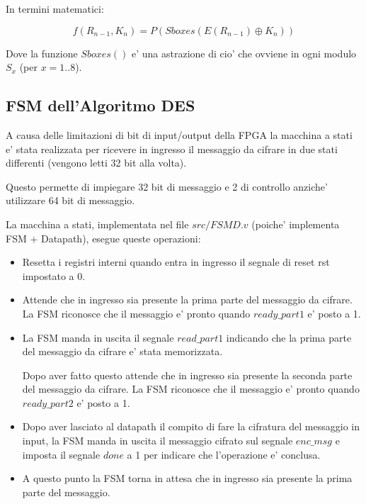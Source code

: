 \documentclass[a4paper]{article}
\begin{document}
In termini matematici:

$$f(R_{n-1}, K_n) = P(Sboxes(E(R_{n-1}) \oplus K_n))$$

Dove la funzione $Sboxes()$ e' una astrazione di cio' che ovviene in ogni modulo $S_x$ (per $x = 1 .. 8$).




\subsection{FSM dell'Algoritmo DES}

A causa delle limitazioni di bit di input/output della FPGA la macchina a stati e' stata realizzata per ricevere in ingresso il messaggio da cifrare in due stati differenti (vengono letti 32 bit alla volta).

Questo permette di impiegare 32 bit di messaggio e 2 di controllo anziche' utilizzare 64 bit di messaggio.

La macchina a stati, implementata nel file $src/FSMD.v$ (poiche' implementa FSM + Datapath), esegue queste operazioni:
\begin{itemize}
    \item Resetta i registri interni quando entra in ingresso il segnale di reset rst impostato a 0.
    

    \item Attende che in ingresso sia presente la prima parte del messaggio da cifrare. La FSM riconosce che il messaggio e' pronto quando $ready\_part1$ e' posto a 1.
    \item La FSM manda in uscita il segnale $read\_part1$ indicando che la prima parte del messaggio da cifrare e' stata memorizzata.
          
          Dopo aver fatto questo attende che in ingresso sia presente la seconda parte del messaggio da cifrare. La FSM riconosce che il messaggio e' pronto quando $ready\_part2$ e' posto a 1.
    \item Dopo aver lasciato al datapath il compito di fare la cifratura del messaggio in input, la FSM manda in uscita il messaggio cifrato sul segnale $enc\_msg$ e imposta il segnale $done$ a 1 per indicare che l'operazione e' conclusa.
        

    \item A questo punto la FSM torna in attesa che in ingresso sia presente la prima parte del messaggio.
\end{itemize}
\end{document}
